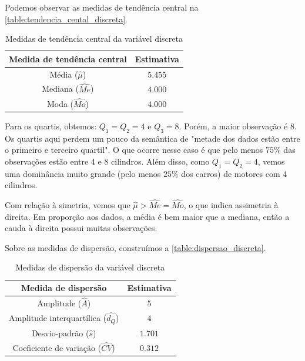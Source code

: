 \documentclass[brazil, a4paper, 12pt]{article}
\begin{document}
    Podemos observar as medidas de tendência central na \autoref{table:tendencia_cental_discreta}.
    \begin{table}[htbp]
        \centering
        \begin{tabular}{cc}
            \toprule
            Medida de tendência central & Estimativa\\
            \midrule
            Média ($\hat{\mu}$)         & $5.455$ \\
            Mediana ($\hat{Me}$)        & $4.000$ \\
            Moda ($\hat{Mo}$)           & $4.000$ \\
            \bottomrule
        \end{tabular}
        \caption{Medidas de tendência central da variável discreta}
        \label{table:tendencia_cental_discreta}
    \end{table}

    Para os quartis, obtemos: $Q_1 = Q_2 = 4$ e $Q_3 = 8$. Porém, a maior observação é 8. Os quartis aqui perdem um pouco da semântica de "metade dos dados estão entre o primeiro e terceiro quartil". O que ocorre nesse caso é que pelo menos $75\%$ das observações estão entre 4 e 8 cilindros. Além disso, como $Q_1 = Q_2 = 4$, vemos uma dominância muito grande (pelo menos $25\%$ dos carros) de motores com 4 cilindros.

    Com relação à simetria, vemos que $\hat \mu > \hat{Me} = \hat{Mo}$, o que indica assimetria à direita. Em proporção aos dados, a média é bem maior que a mediana, então a cauda à direita possui muitas observações.

    Sobre as medidas de dispersão, construímos a \autoref{table:dispersao_discreta}.

    \begin{table}[htbp]
        \centering
        \begin{tabular}{cc}
            \toprule
            Medida de dispersão                   & Estimativa \\
            \midrule
            Amplitude ($\hat{A}$)                   & $5$ \\
            Amplitude interquartílica ($\hat{d_Q}$) & $4$ \\
            Desvio-padrão ($\hat{s}$)               & $1.701$ \\
            Coeficiente de variação ($\hat{CV}$)    & $0.312$ \\
            \bottomrule
        \end{tabular}
        \caption{Medidas de dispersão da variável discreta}
        \label{table:dispersao_discreta}
    \end{table}
    \newpage
\end{document}
